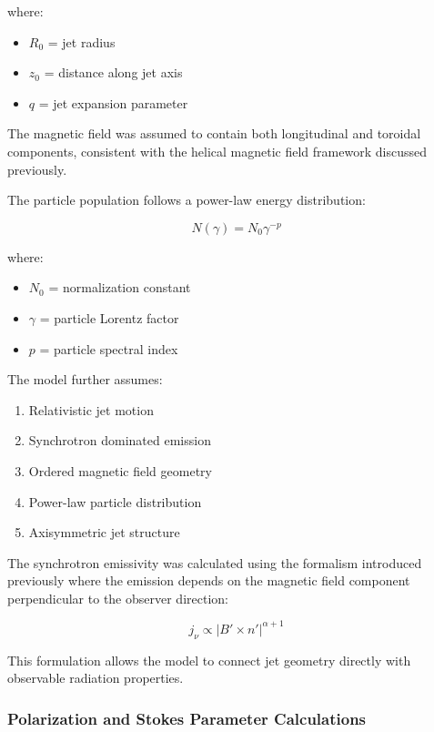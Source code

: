 \documentclass{article}
\begin{document}
where:

\begin{itemize}
\item $R_0$ = jet radius
\item $z_0$ = distance along jet axis
\item $q$ = jet expansion parameter
\end{itemize}

The magnetic field was assumed to contain both longitudinal and toroidal components, consistent with the helical magnetic field framework discussed previously.

The particle population follows a power-law energy distribution:

\begin{equation}
N(\gamma)
=
N_0\gamma^{-p}
\end{equation}

where:

\begin{itemize}
\item $N_0$ = normalization constant
\item $\gamma$ = particle Lorentz factor
\item $p$ = particle spectral index
\end{itemize}

The model further assumes:

\begin{enumerate}
\item Relativistic jet motion
\item Synchrotron dominated emission
\item Ordered magnetic field geometry
\item Power-law particle distribution
\item Axisymmetric jet structure
\end{enumerate}

The synchrotron emissivity was calculated using the formalism introduced previously where the emission depends on the magnetic field component perpendicular to the observer direction:

\begin{equation}
j_\nu
\propto
|B'\times n'|^{\alpha+1}
\end{equation}

This formulation allows the model to connect jet geometry directly with observable radiation properties.


\subsubsection{Polarization and Stokes Parameter Calculations}
\end{document}
